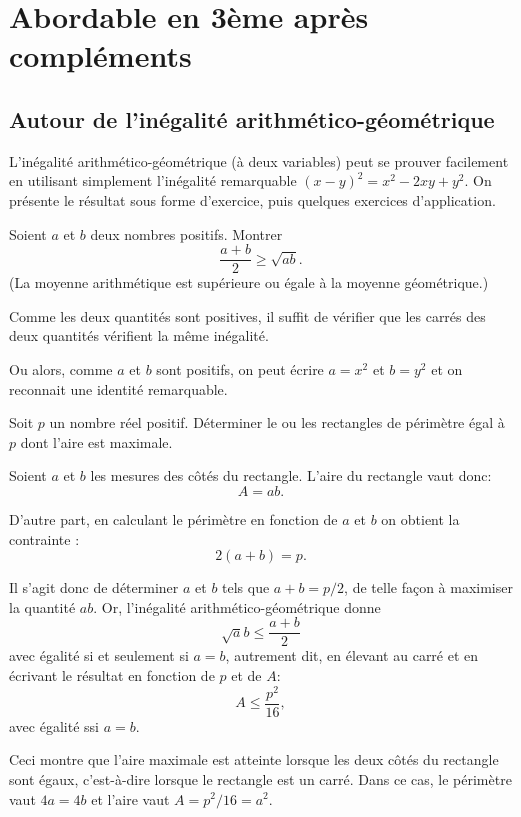 \section{Abordable en 3ème après compléments}


\subsection{Autour de l'inégalité arithmético-géométrique}

L'inégalité arithmético-géométrique (à deux variables) peut se prouver facilement en utilisant simplement l'inégalité remarquable $(x-y)^2=x^2-2xy+y^2$. On présente le résultat sous forme d'exercice, puis quelques exercices d'application.

\begin{exo}
Soient $a$ et $b$ deux nombres positifs. Montrer
\[ \frac{a+b}{2} \geq \sqrt{ab}.\]
(\og La moyenne arithmétique est supérieure ou égale à la moyenne géométrique.\fg)
\begin{sol}
Comme les deux quantités sont positives, il suffit de vérifier que les carrés des deux quantités vérifient la même inégalité. 

Ou alors, comme $a$ et $b$ sont positifs, on peut écrire $a=x^2$ et $b=y^2$ et on reconnait une identité remarquable.
\end{sol}
\end{exo}



\begin{exo} Soit $p$ un nombre réel positif. Déterminer le ou les rectangles de périmètre égal à $p$ dont l'aire est maximale.
\begin{sol}
Soient $a$ et $b$ les mesures des côtés du rectangle. L'aire du rectangle vaut donc: 
\[ A=ab.\]
 
D'autre part, en  calculant le périmètre en fonction de $a$ et $b$ on obtient la contrainte :
\[ 2(a+b)=p.\]

Il s'agit donc de déterminer $a$ et $b$ tels que $a+b=p/2$, de telle façon à maximiser la quantité $ab$. Or, l'inégalité arithmético-géométrique donne
\[ \sqrt ab \leq \frac{a+b}{2} \]
avec égalité si et seulement si $a=b$, autrement dit, en élevant au carré et en écrivant le résultat en fonction de $p$ et de $A$:
\[ A \leq \frac{p^2}{16},\]
avec égalité ssi $a=b$.

Ceci montre que l'aire maximale est atteinte lorsque les deux côtés du rectangle sont égaux, c'est-à-dire lorsque le rectangle est un carré. Dans ce cas, le périmètre vaut $4a=4b$ et l'aire vaut $A=p^2/16 = a^2$.
\end{sol}
\end{exo}

